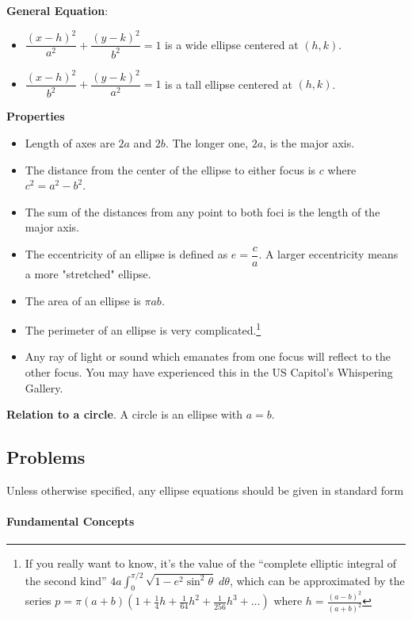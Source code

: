 \documentclass[11pt]{article}
\begin{document}
\textbf{General Equation}:
\begin{itemize}
  \item \(\dfrac{(x-h)^2}{a^2} + \dfrac{(y-k)^2}{b^2} = 1\) is a wide ellipse
centered at \((h,k)\).
  \item \(\dfrac{(x-h)^2}{b^2} + \dfrac{(y-k)^2}{a^2} = 1\) is a tall ellipse
  centered at \((h,k)\).
\end{itemize}
\textbf{Properties}

\begin{itemize}

\item
  Length of axes are \(2a\) and \(2b\). The longer one, $2a$, is the major
  axis.
\item
  The distance from the center of the ellipse to either focus is \(c\)
  where \(c^2 = a^2-b^2\).
\item
  The sum of the distances from any point to both foci is the length of the
	major axis.
\item
  The eccentricity of an ellipse is defined as \(e = \dfrac{c}{a}\). A larger eccentricity
	means a more "stretched" ellipse.
\item
  The area of an ellipse is \(\pi a b\).
\item
  The perimeter of an ellipse is very complicated.\footnote{If you really
    want to know, it's the value of the ``complete elliptic integral of
    the second kind''
    \(4a \int_0^{\pi/2} \sqrt{1 - e^2 \sin^2 \theta} \; d\theta\), which
    can be approximated by the series
    \(p = \pi(a+b)\left(1 + \frac14 h + \frac{1}{64}h^2 + \frac{1}{256}h^3 + \ldots\right)\)
    where \(h = \frac{(a-b)^2}{(a+b)^2}\)}
\item
  Any ray of light or sound which emanates from one focus will reflect
  to the other focus. You may have experienced this in the US Capitol's
  Whispering Gallery.
\end{itemize}

\textbf{Relation to a circle}. A circle is an ellipse with \(a=b\).

\hypertarget{problems}{%
\subsection{Problems}\label{problems}}

Unless otherwise specified, any ellipse equations should be given in
standard form

\hypertarget{fundamental-concepts}{%
\paragraph{Fundamental Concepts}\label{fundamental-concepts}}
\end{document}
